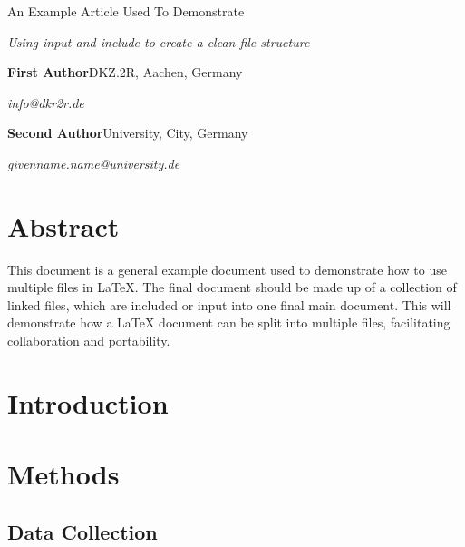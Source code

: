 \documentclass{article}
\newcommand{\authorinfo}[3]{
  \noindent\textbf{#1}\hfill #2\par
  \noindent\textit{#3}\par\vspace{0.5em}}
\begin{document}
\begin{titlepage}
\centering
\begin{huge}
    An Example Article Used To Demonstrate
\end{huge}

\vspace{1cm}

\begin{large}
	\textit{Using input and include to create a clean file structure}
\end{large}


\vfill

\raggedright

\authorinfo{First Author}{DKZ.2R, Aachen, Germany}{info@dkr2r.de}

\authorinfo{Second Author}{University, City, Germany}{givenname.name@university.de}

\end{titlepage}

\section*{Abstract}
This document is a general example document used to demonstrate how to use multiple files in LaTeX.
The final document should be made up of a collection of linked files, which are included or input into one final main document.
This will demonstrate how a LaTeX document can be split into multiple files, facilitating collaboration and portability.

\newpage

\tableofcontents

\listoffigures

\newpage

\section{Introduction}

\lipsum[1-2]

\section{Methods}

\lipsum[3]

\subsection{Data Collection}

\lipsum[4]
\end{document}
